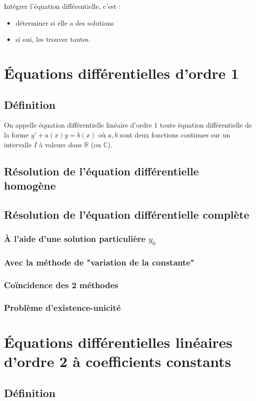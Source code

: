 \documentclass[12pt,a4paper,french]{book}
\begin{document}
	Intégrer l'équation différentielle, c'est : \begin{itemize}
		\item déterminer si elle a des solutions
		\item si oui, les trouver toutes.
	\end{itemize}
	\section{Équations différentielles d'ordre 1}
		\subsection{Définition}
		On appelle équation différentielle linéaire d'ordre 1 toute équation différentielle de la forme $y' +a(x)y = b(x)$ où $a,b$ sont deux fonctions continues sur un intervalle $I$ à valeurs dans $\mathbb{R}$ (ou $\mathbb{C}$).
		\subsection{Résolution de l'équation différentielle homogène}
		\subsection{Résolution de l'équation différentielle complète}
			\subsubsection{À l'aide d'une solution particulière $y_0$}
			\subsubsection{Avec la méthode de "variation de la constante"}
			\subsubsection{Coïncidence des 2 méthodes}
			\subsubsection{Problème d'existence-unicité}
	\section{Équations différentielles linéaires d'ordre 2 à coefficients constants}
		\subsection{Définition}
\end{document}
